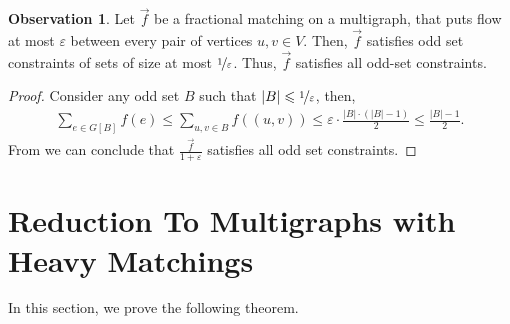 \documentclass[a4paper,11pt]{article}
\newcommand{\card}[1]{|#1|}
\newcommand{\eps}{\varepsilon}
\theoremstyle{definition}
\theoremstyle{definition}
\theoremstyle{definition}
\theoremstyle{definition}
\theoremstyle{definition}
\theoremstyle{definition}
\theoremstyle{definition}
\newtheorem{observation2}[definition2]{Observation}
\theoremstyle{definition}
\theoremstyle{definition}
\theoremstyle{definition}
\theoremstyle{definition}
\theoremstyle{definition}
\theoremstyle{definition}
\theoremstyle{definition}
\theoremstyle{definition}
\begin{document}
\begin{observation2}\label{obs:litteflow}
Let $\vec{f}$ be a fractional matching on a multigraph, that puts flow at most $\eps$ between every pair of vertices $u,v\in V$. Then, $\vec{f}$ satisfies odd set constraints of sets of size at most $\nicefrac{1}{\eps}$. Thus, $\vec{f}$ satisfies all odd-set constraints.
\end{observation2}
\begin{proof}
Consider any odd set $B$ such that $\card{B}\leqslant \nicefrac{1}{\eps}$, then,
\begin{align*}
\sum_{e\in G[B]}f(e)\leqslant \sum_{u,v\in B} f((u,v))\leqslant \eps\cdot \frac{\card{B}\cdot (\card{B}-1)}{2}\leqslant \frac{\card{B}-1}{2}.
\end{align*}
From  we can conclude that $\frac{\vec{f}}{1+\eps}$ satisfies all odd set constraints. 
\end{proof}



\section{Reduction To Multigraphs with Heavy Matchings}
\label{sec:redc}
In this section, we prove the following theorem.
\end{document}
